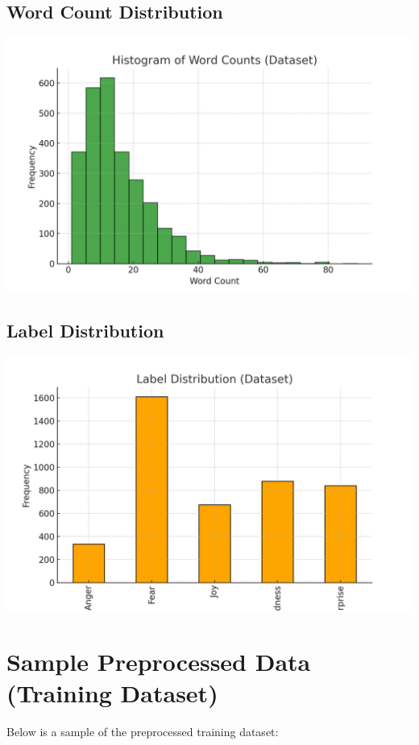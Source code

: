 \documentclass{article}
\begin{document}
\subsection*{Word Count Distribution}
\includegraphics[width=\textwidth]{updated_word_count_histogram.png}

\subsection*{Label Distribution}
\includegraphics[width=\textwidth]{updated_label_distribution.png}

\section*{Sample Preprocessed Data (Training Dataset)}
Below is a sample of the preprocessed training dataset:
\end{document}
